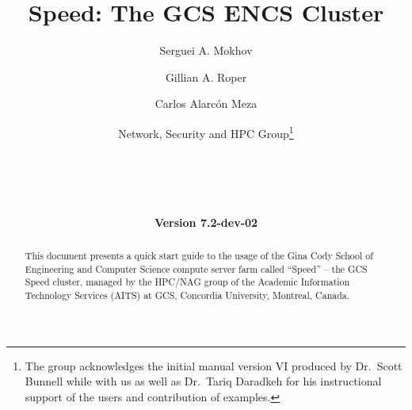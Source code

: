 \documentclass{easychair}
\begin{document}
%
\title{Speed: The GCS ENCS Cluster}

%

\date{\textbf{Version 7.2-dev-02}}

%
\author{
    Serguei A. Mokhov
\and
    Gillian A. Roper
\and
    Carlos Alarcón Meza
\and
    Network, Security and HPC Group\footnote{The group acknowledges the initial manual version VI produced by Dr.~Scott Bunnell while with us
		as well as Dr.~Tariq Daradkeh for his instructional support of the users and contribution of examples.}\\
    \\
    \\
    \\
    \\
}

%

\maketitle

\begin{abstract}
This document presents a quick start guide to the usage of the Gina Cody School 
of Engineering and Computer Science compute server farm called ``Speed'' -- the 
GCS Speed cluster, managed by the HPC/NAG group of the Academic Information 
Technology Services (AITS) at GCS, Concordia University, Montreal, Canada.
\end{abstract}
\end{document}
